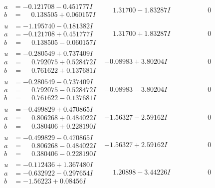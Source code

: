 \documentclass[1p]{elsarticle_modified}
\theoremstyle{definition}
\begin{document}
$$\begin{array}{c|c|c}
\begin{aligned}
a &= -0.121708 - 0.451777 I \\
b &= \phantom{-}0.138505 + 0.060157 I\end{aligned}
 & \phantom{-}1.31700 - 1.83287 I & \phantom{-0.000000 } 0 \\ \hline\begin{aligned}
u &= -1.195740 - 0.181382 I \\
a &= -0.121708 + 0.451777 I \\
b &= \phantom{-}0.138505 - 0.060157 I\end{aligned}
 & \phantom{-}1.31700 + 1.83287 I & \phantom{-0.000000 } 0 \\ \hline\begin{aligned}
u &= -0.280549 + 0.737409 I \\
a &= \phantom{-}0.792075 + 0.528472 I \\
b &= \phantom{-}0.761622 + 0.137681 I\end{aligned}
 & -0.08983 + 3.80204 I & \phantom{-0.000000 } 0 \\ \hline\begin{aligned}
u &= -0.280549 - 0.737409 I \\
a &= \phantom{-}0.792075 - 0.528472 I \\
b &= \phantom{-}0.761622 - 0.137681 I\end{aligned}
 & -0.08983 - 3.80204 I & \phantom{-0.000000 } 0 \\ \hline\begin{aligned}
u &= -0.499829 + 0.470865 I \\
a &= \phantom{-}0.806268 + 0.484022 I \\
b &= \phantom{-}0.380406 + 0.228190 I\end{aligned}
 & -1.56327 - 2.59162 I & \phantom{-0.000000 } 0 \\ \hline\begin{aligned}
u &= -0.499829 - 0.470865 I \\
a &= \phantom{-}0.806268 - 0.484022 I \\
b &= \phantom{-}0.380406 - 0.228190 I\end{aligned}
 & -1.56327 + 2.59162 I & \phantom{-0.000000 } 0 \\ \hline\begin{aligned}
u &= -0.112436 + 1.367480 I \\
a &= -0.632922 - 0.297654 I \\
b &= -1.56223 + 0.08456 I\end{aligned}
 & \phantom{-}1.20898 - 3.44226 I & \phantom{-0.000000 } 0 \\ \hline\begin{aligned}

\end{aligned}
\end{array}$$
\end{document}
